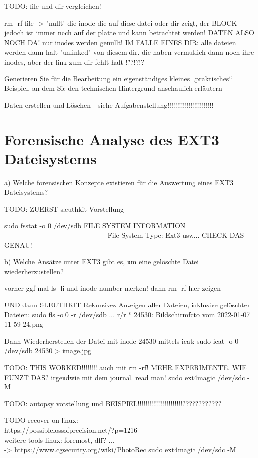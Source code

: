 TODO: file und dir vergleichen!

rm -rf file -> "nullt" die inode die auf diese datei oder dir zeigt, der BLOCK jedoch ist immer noch auf der platte und kann betrachtet werden! DATEN ALSO NOCH DA! nur inodes werden genullt!
IM FALLE EINES DIR: 
alle dateien werden dann halt "unlinked" von diesem dir. die haben vermutlich dann noch ihre inodes, aber der link zum dir fehlt halt !??!?!?

Generieren Sie für die Bearbeitung ein eigenständiges kleines „praktisches“ Beispiel, an dem Sie den
technischen Hintergrund anschaulich erläutern

Daten erstellen und Löschen - siehe Aufgabenstellung!!!!!!!!!!!!!!!!!!!!!!!!


\section{Forensische Analyse des EXT3 Dateisystems}

a) Welche forensischen Konzepte existieren für die Auswertung eines EXT3 Dateisystems? 

TODO: ZUERST sleuthkit Vorstellung


sudo fsstat -o 0 /dev/sdb
FILE SYSTEM INFORMATION
--------------------------------------------
File System Type: Ext3
usw... CHECK DAS GENAU!


b) Welche Ansätze unter EXT3 gibt es, um eine gelöschte Datei wiederherzustellen?

vorher ggf mal ls -li und inode number merken!
dann rm -rf hier zeigen

UND dann SLEUTHKIT
Rekursives Anzeigen aller Dateien, inklusive gelöschter Dateien:
sudo fls -o 0 -r /dev/sdb
...
r/r * 24530:	Bildschirmfoto vom 2022-01-07 11-59-24.png

Dann Wiederherstellen der Datei mit inode 24530 mittels icat:
sudo icat -o 0 /dev/sdb 24530 > image.jpg


TODO: THIS WORKED!!!!!!!! auch mit rm -rf! MEHR EXPERIMENTE. WIE FUNZT DAS?
irgendwie mit dem journal. read man!
sudo ext4magic /dev/sdc -M




TODO: autopsy vorstellung und BEISPIEL!!!!!!!!!!!!!!!!!!!!!!!????????????

TODO recover on linux:\\
	https://possiblelossofprecision.net/?p=1216\\
	weitere tools linux: foremost, dff? ...\\
		-> https://www.cgsecurity.org/wiki/PhotoRec
	sudo ext4magic /dev/sdc -M

